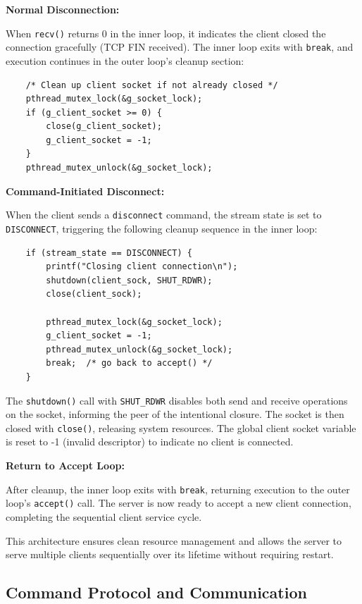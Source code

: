 \textbf{Normal Disconnection:}

When \texttt{recv()} returns 0 in the inner loop, it indicates the client closed the connection gracefully (TCP FIN received). The inner loop exits with \texttt{break}, and execution continues in the outer loop's cleanup section:

\begin{verbatim}
	/* Clean up client socket if not already closed */
	pthread_mutex_lock(&g_socket_lock);
	if (g_client_socket >= 0) {
		close(g_client_socket);
		g_client_socket = -1;
	}
	pthread_mutex_unlock(&g_socket_lock);
\end{verbatim}

\textbf{Command-Initiated Disconnect:}

When the client sends a \texttt{disconnect} command, the stream state is set to \texttt{DISCONNECT}, triggering the following cleanup sequence in the inner loop:

\begin{verbatim}
	if (stream_state == DISCONNECT) {
		printf("Closing client connection\n");
		shutdown(client_sock, SHUT_RDWR);
		close(client_sock);
		
		pthread_mutex_lock(&g_socket_lock);
		g_client_socket = -1;
		pthread_mutex_unlock(&g_socket_lock);
		break;  /* go back to accept() */
	}
\end{verbatim}

The \texttt{shutdown()} call with \texttt{SHUT\_RDWR} disables both send and receive operations on the socket, informing the peer of the intentional closure. The socket is then closed with \texttt{close()}, releasing system resources. The global client socket variable is reset to -1 (invalid descriptor) to indicate no client is connected.

\textbf{Return to Accept Loop:}

After cleanup, the inner loop exits with \texttt{break}, returning execution to the outer loop's \texttt{accept()} call. The server is now ready to accept a new client connection, completing the sequential client service cycle.

This architecture ensures clean resource management and allows the server to serve multiple clients sequentially over its lifetime without requiring restart.


\subsection{Command Protocol and Communication}


